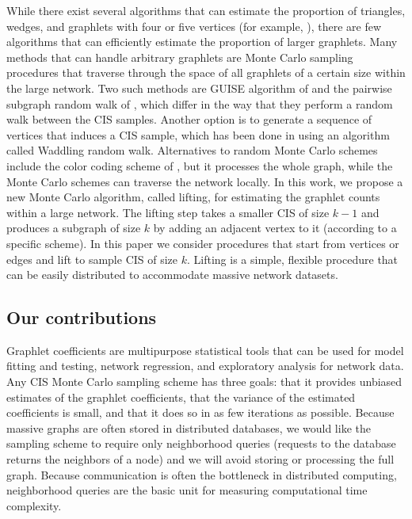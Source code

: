 	While there exist several algorithms that can estimate the proportion of triangles, wedges, and graphlets with four or five vertices (for example, \cite{Ahmed2017count, rahman2014graft}), there are few algorithms that can efficiently estimate the proportion of larger graphlets.
	Many methods that can handle arbitrary graphlets are Monte Carlo sampling procedures that traverse through the space of all graphlets of a certain size within the large network.
	Two such methods are GUISE algorithm of \cite{bhuiyan2012guise} and the pairwise subgraph random walk of \cite{Wang2014psrw}, which differ in the way that they perform a random walk between the CIS samples.
	Another option is to generate a sequence of vertices that induces a CIS sample, which has been done in \cite{Han2016waddling} using an algorithm called Waddling random walk.
	Alternatives to random Monte Carlo schemes include the color coding scheme of \cite{Bressan2017colourcoding}, but it processes the whole graph, while the Monte Carlo schemes can traverse the network locally.
    In this work, we propose a new Monte Carlo algorithm, called lifting, for estimating the graphlet counts within a large network.
    The lifting step takes a smaller CIS of size $k-1$ and produces a subgraph of size $k$ by adding an adjacent vertex to it (according to a specific scheme).  
    In this paper we consider procedures that start from vertices or edges and lift to sample CIS of size $k$.
	Lifting is a simple, flexible procedure that can be easily distributed to accommodate massive network datasets.
	
	\subsection{Our contributions}
	
	Graphlet coefficients are multipurpose statistical tools that can be used for model fitting and testing, network regression, and exploratory analysis for network data.
    Any CIS Monte Carlo sampling scheme has three goals: that it provides unbiased estimates of the graphlet coefficients, that the variance of the estimated coefficients is small, and that it does so in as few iterations as possible.
    Because massive graphs are often stored in distributed databases, we would like the sampling scheme to require only neighborhood queries (requests to the database returns the neighbors of a node) and we will avoid storing or processing the full graph.
    Because communication is often the bottleneck in distributed computing, neighborhood queries are the basic unit for measuring computational time complexity.
    
